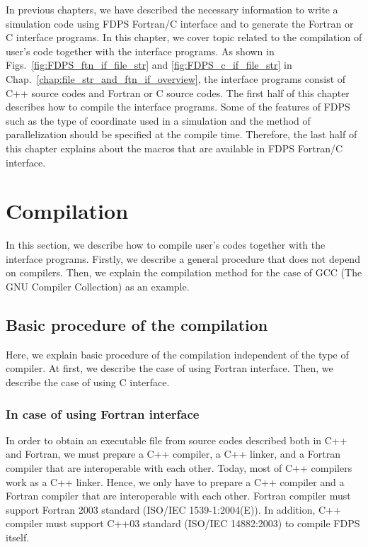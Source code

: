 In previous chapters, we have described the necessary information to write a simulation code using FDPS Fortran/C interface and to generate the Fortran or C interface programs. In this chapter, we cover topic related to the compilation of user's code together with the interface programs. As shown in Figs.~\ref{fig:FDPS_ftn_if_file_str} and \ref{fig:FDPS_c_if_file_str} in Chap.~\ref{chap:file_str_and_ftn_if_overview}, the interface programs consist of C++ source codes and Fortran or C source codes. The first half of this chapter describes how to compile the interface programs. Some of the features of FDPS such as the type of coordinate used in a simulation and the method of parallelization should be specified at the compile time. Therefore, the last half of this chapter explains about the macros that are available in FDPS Fortran/C interface. 

\section{Compilation}
In this section, we describe how to compile user's codes together with the interface programs. Firstly, we describe a general procedure that does not depend on compilers. Then, we explain the compilation method for the case of  GCC (The GNU Compiler Collection) as an example.
\subsection{Basic procedure of the compilation}
\label{subsec:compile:basic_procedures}
Here, we explain basic procedure of the compilation independent of the type of compiler. At first, we describe the case of using Fortran interface. Then, we describe the case of using C interface.

\subsubsection{In case of using Fortran interface}
In order to obtain an executable file from source codes described both in C++ and Fortran, we must prepare a C++ compiler, a C++ linker, and a Fortran compiler that are interoperable with each other. Today, most of C++ compilers work as a C++ linker. Hence, we only have to prepare a C++ compiler and a Fortran compiler that are interoperable with each other. Fortran compiler must support Fortran 2003 standard (ISO/IEC 1539-1:2004(E)). In addition, C++ compiler must support C++03 standard (ISO/IEC 14882:2003) to compile FDPS itself.

